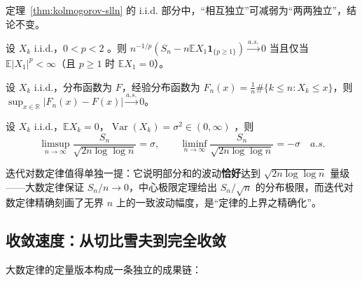 \begin{theorem}[Etemadi，1981]\label{thm:etemadi}
    定理~\ref{thm:kolmogorov-slln} 的 i.i.d. 部分中，“相互独立”可减弱为“两两独立”，结论不变。
\end{theorem}

\begin{theorem}\label{thm:mz}
    设 $X_k$ i.i.d.，$0 < p < 2$ \cite{marcinkiewicz1937}。则 $n^{-1/p}\left(S_n - n\mathbb{E}X_1 \mathbf{1}_{\{p \geq 1\}}\right) \xrightarrow{a.s.} 0$
    当且仅当 $\mathbb{E}|X_1|^p < \infty$（且 $p \geq 1$ 时 $\mathbb{E}X_1 = 0$）。
\end{theorem}

\begin{theorem}\label{thm:gc}
    设 $X_k$ i.i.d.，分布函数为 $F$，经验分布函数为 $F_n(x) = \frac{1}{n}\#\{k \leq n: X_k \leq x\}$，则
    $\sup_{x \in \mathbb{R}} |F_n(x) - F(x)| \xrightarrow{a.s.} 0$。
\end{theorem}

\begin{theorem}\label{thm:lil}
    设 $X_k$ i.i.d.，$\mathbb{E}X_k = 0$，$\operatorname{Var}(X_k) = \sigma^2 \in (0, \infty)$ \cite{hartmanwintner1941}，则
    \begin{equation}
        \limsup_{n \to \infty} \frac{S_n}{\sqrt{2 n \log\log n}} = \sigma, \qquad
        \liminf_{n \to \infty} \frac{S_n}{\sqrt{2 n \log\log n}} = -\sigma \quad a.s.
    \end{equation}
\end{theorem}

迭代对数定律值得单独一提：它说明部分和的波动\textbf{恰好}达到 $\sqrt{2 n \log\log n}$ 量级——大数定律保证 $S_n/n \to 0$，中心极限定理给出 $S_n/\sqrt{n}$ 的分布极限，而迭代对数定律精确刻画了无界 $n$ 上的一致波动幅度，是“定律的上界之精确化”。

\subsection{收敛速度：从切比雪夫到完全收敛}

大数定律的定量版本构成一条独立的成果链：


